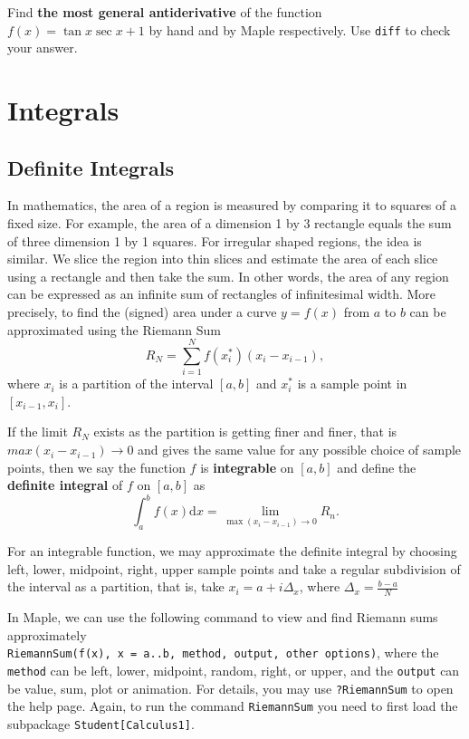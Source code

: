 \documentclass[
  en,11pt,simple]{elegantbook}
\newcommand{\size}[2]{{\fontsize{#1}{0}\selectfont#2}}
\renewenvironment{exercise}[1][]{
    \refstepcounter{exer}
    \par\noindent
    \makebox[-3pt][r]{\color{red!90}\size{12}{\HandPencilLeft}}
	\textbf{\color{main}{\exercisename} \theexer #1}
    \rmfamily
}{\par\ignorespacesafterend}
\begin{document}
\begin{exercise}

Find \textbf{the most general antiderivative} of the function \(f(x)=\tan x\sec x+1\) by hand and by Maple respectively. Use \texttt{diff} to check your answer.
\end{exercise}

\hypertarget{integrals}{%
\chapter{Integrals}\label{integrals}}

\hypertarget{definite-integrals}{%
\section{Definite Integrals}\label{definite-integrals}}

In mathematics, the area of a region is measured by comparing it to squares of a fixed size. For example, the area of a dimension 1 by 3 rectangle equals the sum of three dimension 1 by 1 squares. For irregular shaped regions, the idea is similar. We slice the region into thin slices and estimate the area of each slice using a rectangle and then take the sum. In other words, the area of any region can be expressed as an infinite sum of rectangles of infinitesimal width. More precisely, to find the (signed) area under a curve \(y=f(x)\) from \(a\) to \(b\) can be approximated using the Riemann Sum
\[
R_N=\sum _{i=1}^{N}f(x_i^*)(x_i-x_{i-1}),
\]
where \(x_i\) is a partition of the interval \([a,b]\) and \(x_i^*\) is a sample point in \([x_{i-1}, x_i]\).

If the limit \(R_N\) exists as the partition is getting finer and finer, that is \(max(x_i-x_{i-1})\to 0\) and gives the same value for any possible choice of sample points, then we say the function \(f\) is \textbf{integrable} on \([a, b]\) and define the \textbf{definite integral} of \(f\) on \([a, b]\) as
\[
\int_a^bf(x)\mathrm{d} x= \lim\limits_{\max(x_i-x_{i-1})\to 0}R_n.
\]

For an integrable function, we may approximate the definite integral by choosing left, lower, midpoint, right, upper sample points and take a regular subdivision of the interval as a partition, that is, take \(x_i=a+i\Delta_x\), where \(\Delta_x=\frac{b-a}{N}\)

In Maple, we can use the following command to view and find Riemann sums approximately
\texttt{RiemannSum(f(x),\ x\ =\ a..b,\ method,\ output,\ other\ options)}, where the \texttt{method} can be left, lower, midpoint, random, right, or upper, and the \texttt{output} can be value, sum, plot or animation. For details, you may use \texttt{?RiemannSum} to open the help page.
Again, to run the command \texttt{RiemannSum} you need to first load the subpackage \texttt{Student{[}Calculus1{]}}.
\end{document}
